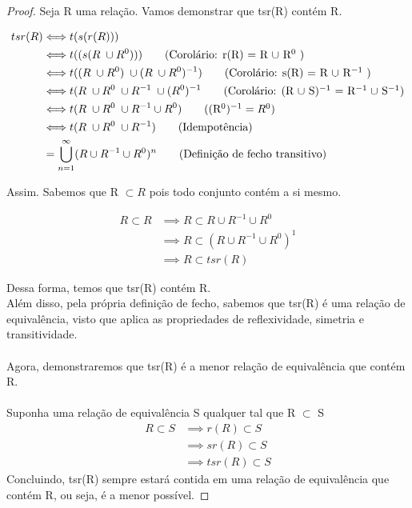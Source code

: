 \documentclass[12pt]{article}
\begin{document}
\begin{proof}
    Seja R uma relação. Vamos demonstrar que tsr(R) contém R.

    \begin{align}
        tsr(R) 
        &\Longleftrightarrow t(s(r(R))) \\
        &\Longleftrightarrow t((s(R \; \cup R^0))) \tag{Corolário: r(R) = R $\cup$ R$^0$ } \\
        &\Longleftrightarrow t((R \; \cup R^0) \; \cup (R \;\cup R^0)^{-1}) \tag{Corolário: s(R) = R $\cup$ R$^{-1}$ } \\
        &\Longleftrightarrow t(R \; \cup R^0 \; \cup R^{-1} \; \cup (R^0)^{-1} \tag{Corolário: (R $\cup$ S)$^{-1}$ = R$^{-1} \; \cup$ S$^{-1}$} \\
        &\Longleftrightarrow t(R \; \cup R^0 \; \cup R^{-1} \cup R^0) \tag{(R$^0)^{-1} = R^0$} \\
        &\Longleftrightarrow t(R \; \cup R^0 \; \cup R^{-1})   \tag{Idempotência} \\
        &= \bigcup_{n=1}^{\infty} (R \cup R^{-1} \cup R^0)^{n} \tag{Definição de fecho transitivo}
    \end{align}

Assim. Sabemos que R $\subset R$ pois todo conjunto contém a si mesmo.

    \begin{align}
        R \subset R
        &\implies R \subset R \cup R^{-1} \cup R^0  \tag{Idempotência} \\
        &\implies R \subset (R \cup R^{-1} \cup R^0)^1 \\
        &\implies R \subset tsr(R)
    \end{align}

Dessa forma, temos que tsr(R) contém R. \\
Além disso, pela própria definição de fecho, sabemos que tsr(R) é uma relação de equivalência, visto que aplica as propriedades de reflexividade, simetria e transitividade. 
\\
\\
Agora, demonstraremos que tsr(R) é a menor relação de equivalência que contém R.\\
\\
Suponha uma relação de equivalência S qualquer tal que R $\subset$ S
\begin{align}
    R \subset S
    & \implies r(R) \subset S \tag{S já é reflexiva } \\
    & \implies sr(R) \subset S \tag{S já é simétrica} \\
    & \implies tsr(R) \subset S \tag{S já é transitiva}
\end{align}
Concluindo, tsr(R) sempre estará contida em uma relação de equivalência que contém R, ou seja, é a menor possível. 

\end{proof}
\end{document}
